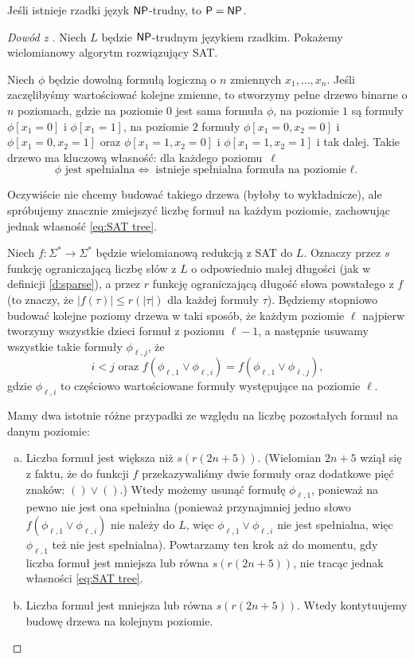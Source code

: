 \begin{theorem}[Mahaneya]\label{t:Mahaney}
    Jeśli istnieje rzadki język $\textsf{NP}$-trudny, to $\textsf{P} = \textsf{NP}$.
\end{theorem}
\begin{proof}[Dowód z \cite{Grochow16}]
    Niech $L$ będzie $\textsf{NP}$-trudnym językiem rzadkim. Pokażemy wielomianowy algorytm rozwiązujący SAT.

    Niech $\phi$ będzie dowolną formułą logiczną o $n$ zmiennych $x_1, \ldots, x_n$. Jeśli zaczęlibyśmy wartościować kolejne zmienne, to stworzymy pełne drzewo binarne o $n$ poziomach, gdzie na poziomie $0$ jest sama formuła $\phi$, na poziomie $1$ są formuły $\phi[x_1 = 0]$ i $\phi[x_1 = 1]$, na poziomie $2$ formuły $\phi[x_1 = 0, x_2 = 0]$ i $\phi[x_1 = 0, x_2 = 1]$ oraz $\phi[x_1 = 1, x_2 = 0]$ i $\phi[x_1 = 1, x_2 = 1]$ i tak dalej. Takie drzewo ma kluczową własność: dla każdego poziomu~$\ell$
    \begin{equation}\label{eq:SAT tree}
        \phi \text{ jest spełnialna} \iff \text{istnieje spełnialna formuła na poziomie $\ell$.}
    \end{equation}

    Oczywiście nie chcemy budować takiego drzewa (byłoby to wykładnicze), ale spróbujemy znacznie zmiejszyć liczbę formuł na każdym poziomie, zachowując jednak własność \ref{eq:SAT tree}.

    Niech $f : \Sigma^* \to \Sigma^*$ będzie wielomianową redukcją z SAT do $L$. Oznaczy przez $s$ funkcję ograniczającą liczbę słów z $L$ o odpowiednio małej długości (jak w definicji \ref{d:sparse}), a przez $r$ funkcję ograniczającą długość słowa powstałego z $f$ (to znaczy, że $|f(\tau)| \leq r(|\tau|)$ dla każdej formuły $\tau$).
    Będziemy stopniowo budować kolejne poziomy drzewa w taki sposób, że każdym poziomie $\ell$ najpierw tworzymy wszystkie dzieci formuł z poziomu $\ell - 1$, a następnie usuwamy wszystkie takie formuły $\phi_{\ell, j}$, że
    \[ i < j \text{ oraz } f(\phi_{\ell, 1} \lor \phi_{\ell, i}) = f(\phi_{\ell, 1} \lor \phi_{\ell, j}), \]
    gdzie $\phi_{\ell, i}$ to częściowo wartościowane formuły występujące na poziomie $\ell$.

    Mamy dwa istotnie różne przypadki ze względu na liczbę pozostałych formuł na danym poziomie:
    \begin{enumerate}[(a)]
        \item Liczba formuł jest większa niż $s(r(2n + 5))$. (Wielomian $2n + 5$ wziął się z faktu, że do funkcji $f$ przekazywaliśmy dwie formuły oraz dodatkowe pięć znaków: $() \lor ()$.)
        Wtedy możemy usunąć formułę $\phi_{\ell, 1}$, ponieważ na pewno nie jest ona spełnialna (ponieważ przynajmniej jedno słowo $f(\phi_{\ell, 1} \lor \phi_{\ell, i})$ nie należy do $L$, więc $\phi_{\ell, 1} \lor \phi_{\ell, i}$ nie jest spełnialna, więc $\phi_{\ell, 1}$ też nie jest spełnialna).
        Powtarzamy ten krok aż do momentu, gdy liczba formuł jest mniejsza lub równa $s(r(2n + 5))$, nie tracąc jednak własności \ref{eq:SAT tree}.
        \item Liczba formuł jest mniejsza lub równa $s(r(2n + 5))$. Wtedy kontytuujemy budowę drzewa na kolejnym poziomie.
    \end{enumerate}


\end{proof}
